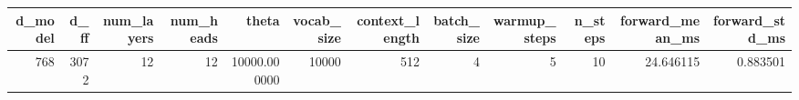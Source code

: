 \begin{tabular}{rrrrrrrrrrrr}
\toprule
d_model & d_ff & num_layers & num_heads & theta & vocab_size & context_length & batch_size & warmup_steps & n_steps & forward_mean_ms & forward_std_ms \\
\midrule
768 & 3072 & 12 & 12 & 10000.000000 & 10000 & 512 & 4 & 5 & 10 & 24.646115 & 0.883501 \\
\bottomrule
\end{tabular}
